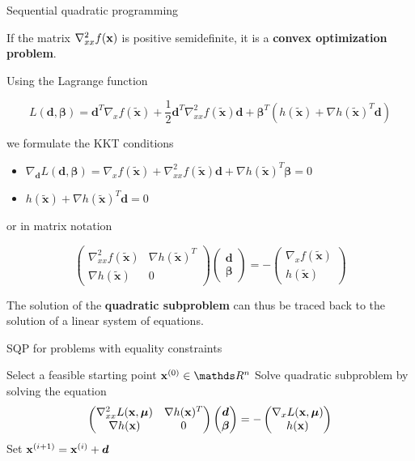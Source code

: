 \documentclass[11pt,compress,t,notes=noshow, xcolor=table]{beamer}
\begin{document}
\begin{vbframe}{Sequential quadratic programming}
\lz

If the matrix $\nabla^2_{xx} f(\mathbf{x})$ is positive semidefinite, it is a \textbf{convex optimization problem}.

\framebreak

Using the Lagrange function

$$
L(\bm{d}, \bm{\beta}) = \bm{d}^T \nabla_{x} f(\bm{\tilde x}) + \frac{1}{2} \bm{d}^T \nabla^2_{xx} f(\bm{\tilde x}) \bm{d} + \bm{\beta}^T (h(\bm{\tilde x}) + \nabla h(\bm{\tilde x})^T\bm{d})
$$

we formulate the KKT conditions

\begin{itemize}
\item $\nabla_{\bm{d}} L(\bm{d}, \bm{\beta}) = \nabla_{x} f(\bm{\tilde x}) + \nabla^2_{xx} f(\bm{\tilde x}) \bm{d} + \nabla h(\bm{\tilde x})^T\bm{\beta} = 0$
\item $h(\bm{\tilde x}) + \nabla h(\bm{\tilde x})^T\bm{d} = 0$
\end{itemize}

or in matrix notation

$$
\begin{pmatrix} \nabla^2_{xx} f(\bm{\tilde x}) & \nabla h(\bm{\tilde x})^T \\ \nabla h(\bm{\tilde x}) & 0 \end{pmatrix} \begin{pmatrix} \bm{d} \\ \bm{\beta} \end{pmatrix} = - \begin{pmatrix} \nabla_{x} f(\bm{\tilde x}) \\ h(\bm{\tilde x}) \end{pmatrix}
$$

The solution of the \textbf{quadratic subproblem} can thus be traced back to the solution of a linear system of equations.


\framebreak

\begin{algorithm}[H]
  \caption{SQP for problems with equality constraints}
  \begin{algorithmic}[1]
  \State Select a feasible starting point $\mathbf{x}^{(0)} \in \R^n$
    \State Solve quadratic subproblem by solving the equation
    $$\begin{pmatrix} \nabla^2_{xx} L(\mathbf{x}, \bm{\mu}) & \nabla h(\mathbf{x})^T \\ \nabla h(\mathbf{x}) & 0 \end{pmatrix} \begin{pmatrix} \bm{d} \\ \bm{\beta} \end{pmatrix} = - \begin{pmatrix} \nabla_{x} L(\mathbf{x}, \bm{\mu}) \\ h(\mathbf{x}) \end{pmatrix}$$
    \State Set $\mathbf{x}^{(i + 1)} = \mathbf{x}^{(i)} + \bm{d}$
  \EndWhile
  \end{algorithmic}
\end{algorithm}


\end{vbframe}
\end{document}
